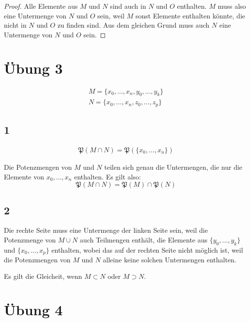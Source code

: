 \documentclass[a4paper,10pt]{article}
\begin{document}
\begin{proof}
 Alle Elemente aus $M$ und $N$ sind auch in $N$ und $O$ enthalten. $M$ muss also eine Untermenge von $N$ und $O$ sein, weil $M$ sonst Elemente enthalten könnte, die nicht in $N$ und $O$ zu finden sind.
 Aus dem gleichen Grund muss auch $N$ eine Untermenge von $N$ und $O$ sein.
\end{proof}

\section*{Übung 3}

\begin{align}
 M = \{x_0, \dots, x_n, y_0, \dots, y_k\}\\
 N = \{x_0, \dots, x_n, z_0, \dots, z_p\}
\end{align}

\subsection*{1}

\begin{align}
 \mathfrak{P}(M \cap N) = \mathfrak{P}(\{x_0, \dots, x_n\})
\end{align}

Die Potenzmengen von $M$ und $N$ teilen sich genau die Untermengen, die nur die Elemente von $x_0, \dots, x_n$ enthalten.
Es gilt also:
\begin{equation}
 \mathfrak{P}(M \cap N) = \mathfrak{P}(M) \cap \mathfrak{P}(N)
\end{equation}

\subsection*{2}

Die rechte Seite muss eine Untermenge der linken Seite sein, weil die Potenzmenge von $M \cup N$ auch Teilmengen enthält, die Elemente aus $\{y_0, \dots, y_k\}$ und $\{x_0, \dots, x_p\}$ enthalten, wobei das auf der rechten Seite nicht möglich ist, weil die Potenzmengen von $M$ und $N$ alleine keine solchen Untermengen enthalten.

Es gilt die Gleicheit, wenn $M \subset N$ oder $M \supset N$. 

\section*{Übung 4}
\end{document}
